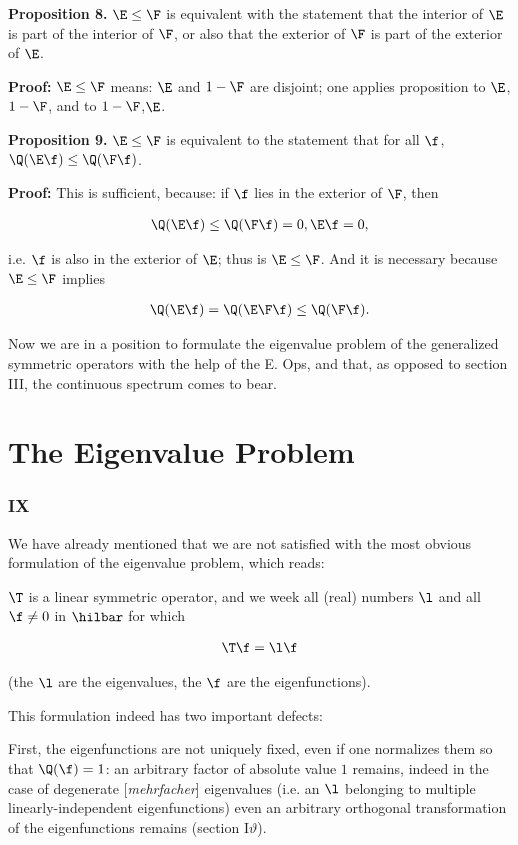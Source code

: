 \documentclass{article}
\newcommand{\WTF}[1]{
[\it{\small{#1}}]
}
\newcommand{\uequ}[1]{
\begin{align*}
#1
\end{align*}
}
\renewcommand{\it}[1]{\textit{#1}}
\begin{document}
\textbf{Proposition 8.} $\E \leq \F$ is equivalent with the statement that the interior of $\E$ is part of the interior of $\F$, or also that the exterior of $\F$ is part of the exterior of $\E$.

\textbf{Proof:} $\E\leq\F$ means: $\E$ and $1-\F$ are disjoint; one applies proposition to $\E$, $1-\F$, and to $1-\F$,$\E$.

\textbf{Proposition 9.} $\E \leq \F$ is equivalent to the statement that for all $\f$, $\Q(\E\f) \leq \Q(\F\f)$.

\textbf{Proof:} This is sufficient, because: if $\f$ lies in the exterior of $\F$, then
\uequ{
\Q(\E\f) \leq \Q(\F\f) = 0, \E\f = 0,
}
i.e. $\f$ is also in the exterior of $\E$; thus is $\E\leq\F$. And it is necessary because $\E \leq \F$ implies
\uequ{
\Q(\E\f) = \Q(\E\F\f) \leq \Q(\F\f).
}

Now we are in a position to formulate the eigenvalue problem of the generalized symmetric operators with the help of the E. Ops, and that, as opposed to section III, the continuous spectrum comes to bear.

\part*{The Eigenvalue Problem}
\section*{IX}
We have already mentioned that we are not satisfied with the most obvious formulation of the eigenvalue problem, which reads:

$\T$ is a linear symmetric operator, and we week all (real) numbers $\l$ and all $\f \neq 0$ in $\hilbar$ for which
\uequ{
\T\f = \l\f
}
(the $\l$ are the eigenvalues, the $\f$ are the eigenfunctions).

This formulation indeed has two important defects:

First, the eigenfunctions are not uniquely fixed, even if one normalizes them so that $\Q(\f)=1$: an arbitrary factor of absolute value $1$ remains, indeed in the case of degenerate\WTF{mehrfacher} eigenvalues (i.e. an $\l$ belonging to multiple linearly-independent eigenfunctions) even an arbitrary orthogonal transformation of the eigenfunctions remains (section I$\vartheta$).
\end{document}
